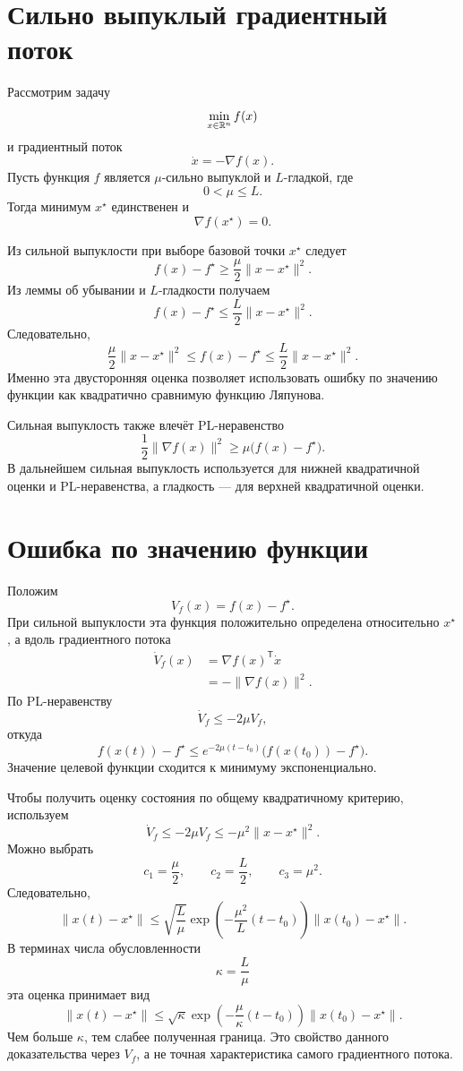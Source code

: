 \section{Сильно выпуклый градиентный поток}

Рассмотрим задачу
\[
    \min_{x\in\mathbb{R}^n}f(x)
\]
и градиентный поток
\[
    \dot x=-\nabla f(x).
\]
Пусть функция \(f\) является \(\mu\)-сильно выпуклой и
\(L\)-гладкой, где
\[
    0<\mu\le L.
\]
Тогда минимум \(x^\star\) единственен и
\[
    \nabla f(x^\star)=0.
\]

Из сильной выпуклости при выборе базовой точки \(x^\star\) следует
\[
    f(x)-f^\star
    \ge
    \frac\mu2\lVert x-x^\star\rVert^2.
\]
Из леммы об убывании и \(L\)-гладкости получаем
\[
    f(x)-f^\star
    \le
    \frac L2\lVert x-x^\star\rVert^2.
\]
Следовательно,
\[
    \frac\mu2\lVert x-x^\star\rVert^2
    \le
    f(x)-f^\star
    \le
    \frac L2\lVert x-x^\star\rVert^2.
\]
Именно эта двусторонняя оценка позволяет использовать ошибку по
значению функции как квадратично сравнимую функцию Ляпунова.

Сильная выпуклость также влечёт PL-неравенство
\[
    \frac12\lVert\nabla f(x)\rVert^2
    \ge
    \mu\bigl(f(x)-f^\star\bigr).
\]
В дальнейшем сильная выпуклость используется для нижней квадратичной
оценки и PL-неравенства, а гладкость — для верхней квадратичной
оценки.

\section{Ошибка по значению функции}

Положим
\[
    V_f(x)=f(x)-f^\star.
\]
При сильной выпуклости эта функция положительно определена
относительно \(x^\star\), а вдоль градиентного потока
\[
\begin{aligned}
    \dot V_f(x)
    &=
    \nabla f(x)^{\mathsf T}\dot x
    \\
    &=
    -\lVert\nabla f(x)\rVert^2.
\end{aligned}
\]
По PL-неравенству
\[
    \dot V_f\le-2\mu V_f,
\]
откуда
\[
    f(x(t))-f^\star
    \le
    e^{-2\mu(t-t_0)}
    \bigl(f(x(t_0))-f^\star\bigr).
\]
Значение целевой функции сходится к минимуму экспоненциально.

Чтобы получить оценку состояния по общему квадратичному критерию,
используем
\[
    \dot V_f
    \le
    -2\mu V_f
    \le
    -\mu^2\lVert x-x^\star\rVert^2.
\]
Можно выбрать
\[
    c_1=\frac\mu2,
    \qquad
    c_2=\frac L2,
    \qquad
    c_3=\mu^2.
\]
Следовательно,
\[
    \lVert x(t)-x^\star\rVert
    \le
    \sqrt{\frac L\mu}
    \exp\left(
        -\frac{\mu^2}{L}(t-t_0)
    \right)
    \lVert x(t_0)-x^\star\rVert.
\]
В терминах числа обусловленности
\[
    \kappa=\frac L\mu
\]
эта оценка принимает вид
\[
    \lVert x(t)-x^\star\rVert
    \le
    \sqrt\kappa
    \exp\left(
        -\frac\mu\kappa(t-t_0)
    \right)
    \lVert x(t_0)-x^\star\rVert.
\]
Чем больше \(\kappa\), тем слабее полученная граница. Это свойство
данного доказательства через \(V_f\), а не точная характеристика
самого градиентного потока.

